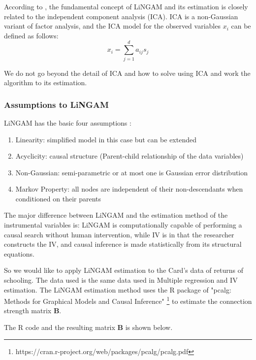\documentclass{article}\usepackage[]{graphicx}\usepackage[]{xcolor}
\begin{document}
According to \cite{shimizu2014lingam}, the fundamental concept of LiNGAM and its estimation is closely related to the independent component analysis (ICA).
ICA is a non-Gaussian variant of factor analysis, and the ICA model for the observed variables $x_i$ can be defined as follows:
$$x_i=\sum_{j=1}^da_{ij}s_j$$

We do not go beyond the detail of ICA and how to solve using ICA and work the algorithm to its estimation. 

\subsubsection*{Assumptions to LiNGAM}
LiNGAM has the basic four assumptions \citep{shimizu2006linear}:

\begin{enumerate}[itemsep=-5mm]
  \item Linearity: simplified model in this case but can be extended\\
  \item Acyclicity: causal structure (Parent-child relationship of the data variables)\\
  \item Non-Gaussian: semi-parametric or at most one is Gaussian error distribution\\
  \item Markov Property: all nodes are independent of their non-descendants when conditioned on their parents\\
\end{enumerate}

The major difference between LiNGAM and the estimation method of the instrumental variables is:
LiNGAM is computationally capable of performing a causal search without human intervention, while IV is in that the researcher constructs the IV, and causal inference is made statistically from its structural equations.

So we would like to apply LiNGAM estimation to the Card’s data of returns of schooling.
The data used is the same data used in Multiple regression and IV estimation.
The LiNGAM estimation method uses the R package of "pcalg: Methods for Graphical Models and Causal Inference" \footnote{https://cran.r-project.org/web/packages/pcalg/pcalg.pdf} to estimate the connection strength matrix $\mathbf{B}$. 

The R code and the resulting matrix $\mathbf{B}$ is shown below.
\end{document}

